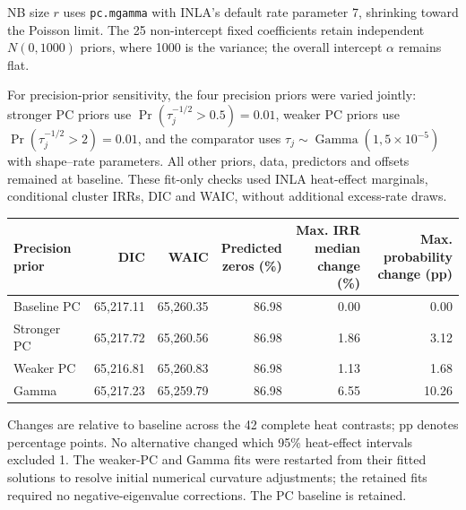 \documentclass[10pt]{article}
\begin{document}
NB size $r$ uses \texttt{pc.mgamma} with INLA's default rate parameter 7,
shrinking toward the Poisson limit. The 25 non-intercept fixed coefficients
retain independent $N(0,1000)$ priors, where 1000 is the variance;
the overall intercept $\alpha$ remains flat.

For precision-prior sensitivity, the four precision priors were varied jointly:
stronger PC priors use $\Pr(\tau_j^{-1/2}>0.5)=0.01$, weaker PC priors use
$\Pr(\tau_j^{-1/2}>2)=0.01$, and the comparator uses
$\tau_j\sim\operatorname{Gamma}(1,5\times10^{-5})$ with shape--rate parameters.
All other priors, data, predictors and offsets remained at baseline.
These fit-only checks used INLA heat-effect marginals, conditional cluster IRRs,
DIC and WAIC, without additional excess-rate draws.
\begin{center}
\small
\setlength{\tabcolsep}{5pt}
\renewcommand{\arraystretch}{1.15}
\begin{tabular}{lrrrrr}
\hline
Precision prior & DIC & WAIC &
\shortstack{Predicted\\zeros (\%)} &
\shortstack{Max. IRR median\\change (\%)} &
\shortstack{Max. probability\\change (pp)}\\
\hline
Baseline PC & 65,217.11 & 65,260.35 & 86.98 & 0.00 & 0.00\\
Stronger PC & 65,217.72 & 65,260.56 & 86.98 & 1.86 & 3.12\\
Weaker PC & 65,216.81 & 65,260.83 & 86.98 & 1.13 & 1.68\\
Gamma & 65,217.23 & 65,259.79 & 86.98 & 6.55 & 10.26\\
\hline
\end{tabular}
\end{center}
Changes are relative to baseline across the 42 complete heat contrasts;
pp denotes percentage points. No alternative changed which 95\% heat-effect
intervals excluded 1. The weaker-PC and Gamma fits were restarted from their
fitted solutions to resolve initial numerical curvature adjustments; the retained
fits required no negative-eigenvalue corrections. The PC baseline is retained.
\end{document}
